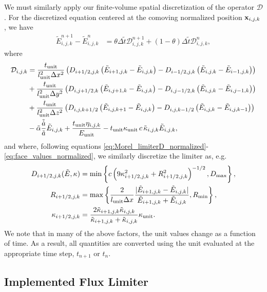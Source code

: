 \documentclass[10pt]{article}
\renewcommand{\(}{\left(}
\renewcommand{\)}{\right)}
\newcommand{\xvec}{{\bf x}}
\newcommand{\adot}{\dot{a}}
\newcommand{\mD}{{\mathcal D}}
\newcommand{\Lunit}{l_{\text{unit}}}
\newcommand{\Tunit}{t_{\text{unit}}}
\newcommand{\Eunit}{E_{\text{unit}}}
\newcommand{\Kunit}{\kappa_{\text{unit}}}
\newcommand{\tK}{\tilde{\kappa}}
\newcommand{\tT}{\tilde{t}}
\newcommand{\tE}{\tilde{E}}
\newcommand{\tA}{\tilde{a}}
\newcommand{\tAdot}{\tilde{\adot}}
\newcommand{\talpha}{\tilde{\alpha}}
\begin{document}
We must similarly apply our finite-volume spatial discretization of
the operator $\mD$.  For the discretized equation centered at the
comoving normalized position $\xvec_{i,j,k}$, we have 
\begin{align}
  \label{eq:mgfld_discrete}
  \tE_{i,j,k}^{n+1} - \tE_{i,j,k}^n &= \theta\Delta \tT \mD_{i,j,k}^{n+1} 
    + (1-\theta)\Delta \tT \mD_{i,j,k}^{n},
\end{align}
where
\begin{align}
  \label{eq:discrete_operator}
  \mD_{i,j,k} &= 
       \frac{\Tunit}{\Lunit^2 \Delta x^2}\(D_{i+1/2,j,k}\(\tE_{i+1,j,k} - \tE_{i,j,k}\) - D_{i-1/2,j,k}\(\tE_{i,j,k} - \tE_{i-1,j,k}\)\) \\
 \notag
    &+ \frac{\Tunit}{\Lunit^2 \Delta y^2}\(D_{i,j+1/2,k}\(\tE_{i,j+1,k} - \tE_{i,j,k}\) - D_{i,j-1/2,k}\(\tE_{i,j,k} - \tE_{i,j-1,k}\)\) \\
  \notag
    &+ \frac{\Tunit}{\Lunit^2 \Delta z^2}\(D_{i,j,k+1/2}\(\tE_{i,j,k+1} - \tE_{i,j,k}\) - D_{i,j,k-1/2}\(\tE_{i,j,k} - \tE_{i,j,k-1}\)\) \\
  \notag
    &- \talpha\frac{\tAdot}{\tA} \tE_{i,j,k} + \frac{\Tunit \eta_{i,j,k}}{\Eunit} 
     - \Tunit \Kunit\, c\, \tK_{i,j,k} \tE_{i,j,k},
\end{align}
and where, following equations
\eqref{eq:Morel_limiterD_normalized}-\eqref{eq:face_values_normalized},
we similarly discretize the limiter as, e.g.
\begin{align}
  \label{eq:discrete_limiter}
  D_{i+1/2,j,k}(\tE,\kappa) &= \min\left\{ c \left(9\kappa_{i+1/2,j,k}^2 + R_{i+1/2,j,k}^2\right)^{-1/2},
    D_\text{max} \right\},\\
  \notag
  R_{i+1/2,j,k} &= \max\left\{\frac{2}{\Lunit \Delta x} \frac{|\tE_{i+1,j,k}-\tE_{i,j,k}|}{\tE_{i+1,j,k}+\tE_{i,j,k}}, R_\text{min} \right\}, \\
  \notag
  \kappa_{i+1/2,j,k} &= \frac{2 \tK_{i+1,j,k} \tK_{i,j,k}}{\tK_{i+1,j,k} + \tK_{i,j,k}}\Kunit.
\end{align}
We note that in many of the above factors, the unit values change
as a function of time.  As a result, all quantities are converted
using the unit evaluated at the appropriate time step, $t_{n+1}$ or
$t_n$.



\subsection{Implemented Flux Limiter}
\label{subsec:limiter_implementation}
\end{document}
